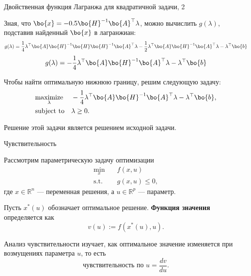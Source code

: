 \documentclass{beamer}
\begin{document}
\begin{frame}{Двойственная функция Лагранжа для квадратичной задачи, 2}
	\begin{flushleft}
		
		Зная, что $\bo{x} = -0.5\bo{H}^{-1}\bo{A}^\top \lambda$, можно вычислить $g(\lambda)$, подставив найденный $\bo{x}$ в лагранжиан:
		\begin{equation}
			g(\lambda) = \frac{1}{4} \lambda^\top \bo{A}\bo{H}^{-1}\bo{H}\bo{H}^{-1}\bo{A}^\top\lambda - \frac{1}{2} \lambda^\top \bo{A}\bo{H}^{-1}\bo{A}^\top \lambda - \lambda^\top\bo{b}
		\end{equation}
		\begin{equation}
			g(\lambda) = -\frac{1}{4} \lambda^\top \bo{A}\bo{H}^{-1}\bo{A}^\top\lambda - \lambda^\top\bo{b}
		\end{equation}
		
		Чтобы найти оптимальную нижнюю границу, решим следующую задачу:
		\begin{equation}
			\begin{aligned}
				& \underset{\lambda}{\text{maximize}}
				& & -\frac{1}{4} \lambda^\top \bo{A}\bo{H}^{-1}\bo{A}^\top\lambda - \lambda^\top\bo{b}, \\
				& \text{subject to}
				& & \lambda \geq 0.
			\end{aligned}
		\end{equation}
		
		Решение этой задачи является решением исходной задачи.
		
	\end{flushleft}
\end{frame}

\begin{frame}{Чувствительность}
	\begin{flushleft}
		
		Рассмотрим параметрическую задачу оптимизации
		\begin{equation}
			\begin{aligned}
				\min_{x} \quad & f(x,u) \\
				\text{s.t.} \quad & g(x,u) \leq 0,
			\end{aligned}
		\end{equation}
		где $x \in \mathbb{R}^n$ — переменная решения, а $u \in \mathbb{R}^p$ — параметр.
		
		Пусть $x^*(u)$ обозначает оптимальное решение. \textbf{Функция значения} определяется как
		\begin{equation}
			v(u) := f(x^*(u), u).
		\end{equation}
		
		
		Анализ чувствительности изучает, как оптимальное значение изменяется при возмущениях параметра $u$, то есть
		\begin{equation}
			\text{чувствительность по } u = \frac{dv}{du}.
		\end{equation}
		
	\end{flushleft}
\end{frame}
\end{document}
